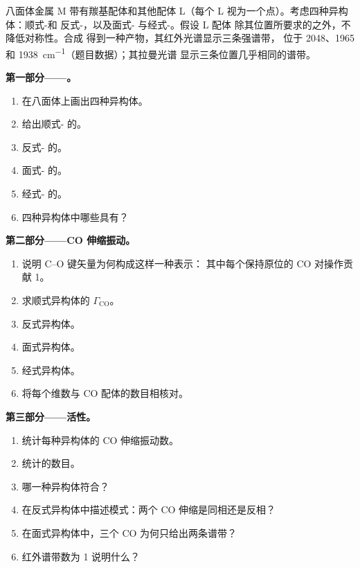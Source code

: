 \begin{problem}
\label{pb:b3:group-theory-applied:1}
八面体金属 M 带有羰基配体和其他配体 L（每个 L
视为一个点）。考虑四种异构体：顺式-和
反式-，以及面式- 与经式-。假设 L 配体
除其位置所要求的之外，不降低对称性。合成
 得到一种产物，其红外光谱显示三条强谱带，
位于 2048、1965 和 \qty{1938}{cm^{-1}}（题目数据）；其拉曼光谱
显示三条位置几乎相同的谱带。

\medskip\noindent\textbf{第一部分——。}
\begin{enumerate}
  \item 在八面体上画出四种异构体。
  \item 给出顺式- 的。
  \item 反式- 的。
  \item 面式- 的。
  \item 经式- 的。
  \item 四种异构体中哪些具有？
\end{enumerate}

\medskip\noindent\textbf{第二部分——CO 伸缩振动。}
\begin{enumerate}[resume]
  \item 说明 C--O 键矢量为何构成这样一种表示：
        其中每个保持原位的 CO 对操作贡献 1。
  \item 求顺式异构体的 $\Gamma_{\mathrm{CO}}$。
  \item 反式异构体。
  \item 面式异构体。
  \item 经式异构体。
  \item 将每个维数与 CO 配体的数目相核对。
\end{enumerate}

\medskip\noindent\textbf{第三部分——活性。}
\begin{enumerate}[resume]
  \item 统计每种异构体的 CO 伸缩振动数。
  \item 统计的数目。
  \item 哪一种异构体符合？
  \item 在反式异构体中描述模式：两个 CO
        伸缩是同相还是反相？
  \item 在面式异构体中，三个 CO 为何只给出两条谱带？
  \item 红外谱带数为 1 说明什么？
\end{enumerate}


\end{problem}
